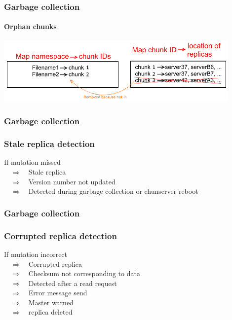 \documentclass{beamer}
\newcommand{\slidewidth}{12cm}
\begin{document}
\begin{frame}
 \frametitle{Garbage collection}
 \framesubtitle{Orphan chunks}
 \centering
 \includegraphics[width=\slidewidth]{figures/orphanschema.png}
\end{frame}

\begin{frame}
 \frametitle{Garbage collection}
 \frametitle{Stale replica detection}
 If mutation missed\\
 ~~$\Rightarrow$~~Stale replica\\
 ~~$\Rightarrow$~~Version number not updated\\
 ~~$\Rightarrow$~~Detected during garbage collection or chunserver reboot
\end{frame}

\begin{frame}
 \frametitle{Garbage collection}
 \frametitle{Corrupted replica detection}
 If mutation incorrect\\
 ~~$\Rightarrow$~~Corrupted replica\\
 ~~$\Rightarrow$~~Checksum not corresponding to data\\
 ~~$\Rightarrow$~~Detected after a read request\\
 ~~$\Rightarrow$~~Error message send\\
 ~~$\Rightarrow$~~Master warned\\
 ~~$\Rightarrow$~~replica deleted
\end{frame}
\end{document}
